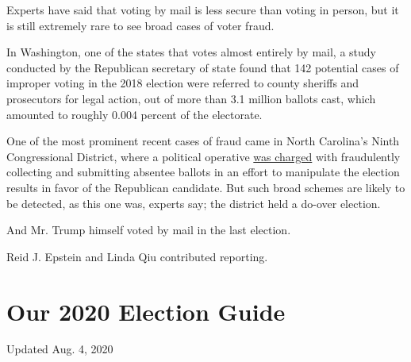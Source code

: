 Experts have said that voting by mail is less secure than voting in
person, but it is still extremely rare to see broad cases of voter
fraud.

In Washington, one of the states that votes almost entirely by mail, a
study conducted by the Republican secretary of state found that 142
potential cases of improper voting in the 2018 election were referred to
county sheriffs and prosecutors for legal action, out of more than 3.1
million ballots cast, which amounted to roughly 0.004 percent of the
electorate.

One of the most prominent recent cases of fraud came in North Carolina's
Ninth Congressional District, where a political operative
\href{https://www.nytimes.com/2019/07/30/us/mccrae-dowless-indictment.html}{was
charged} with fraudulently collecting and submitting absentee ballots in
an effort to manipulate the election results in favor of the Republican
candidate. But such broad schemes are likely to be detected, as this one
was, experts say; the district held a do-over election.

And Mr. Trump himself voted by mail in the last election.

Reid J. Epstein and Linda Qiu contributed reporting.

\hypertarget{our-2020-election-guide}{%
\section{Our 2020 Election Guide}\label{our-2020-election-guide}}

Updated Aug. 4, 2020

